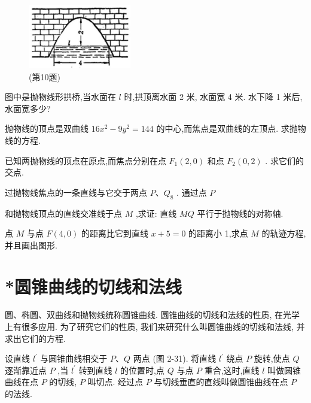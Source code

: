 \documentclass[lang=cn,newtx,12pt,scheme=chinese]{elegantbook}
\begin{document}
\begin{problemset}[习 题 八]
\begin{figure}[h]
  \centering
  \includegraphics[max width=0.4\textwidth]{images/01912cc2-ffb6-728e-9ae7-b113ff05c64b_116_944899.jpg}
  \caption{(第10题)}
\end{figure}

\item 图中是抛物线形拱桥,当水面在 \(l\) 时,拱顶离水面 2 米, 水面宽 4 米. 水下降 1 米后, 水面宽多少?

\item 抛物线的顶点是双曲线 \({16}{x}^{2} - 9{y}^{2} = {144}\) 的中心,而焦点是双曲线的左顶点. 求抛物线的方程.

\item 已知两抛物线的顶点在原点,而焦点分别在点 \({F}_{1}\left( {2,0}\right)\) 和点 \({F}_{2}\left( {0,2}\right)\) . 求它们的交点.

\item 过抛物线焦点的一条直线与它交于两点 \(P\text{、}{Q}_{8}\) . 通过点 \(P\)

和抛物线顶点的直线交准线于点 \(M\) ,求证: 直线 \({MQ}\) 平行于抛物线的对称轴.

\item 点 \(M\) 与点 \(F\left( {4,0}\right)\) 的距离比它到直线 \(x + 5 = 0\) 的距离小 1,求点 \(M\) 的轨迹方程,并且画出图形.

\end{problemset}

\section{*圆锥曲线的切线和法线}

圆、椭圆、双曲线和抛物线统称圆锥曲线. 圆锥曲线的切线和法线的性质, 在光学上有很多应用. 为了研究它们的性质, 我们来研究什么叫圆锥曲线的切线和法线, 并求出它们的方程.

\begin{definition}[切线和法线] 
设直线 \({l}^{\prime }\) 与圆锥曲线相交于 \(P\text{、}Q\) 两点 (图 2-31). 将直线 \({l}^{\prime }\) 绕点 \(P\) 旋转,使点 \(Q\) 逐渐靠近点 \(P\) ,当 \({l}^{\prime }\) 转到直线 \(l\) 的位置时,点 \(Q\) 与点 \(P\) 重合,这时,直线 \(l\) 叫做圆锥曲线在点 \(P\) 的切线, \(P\) 叫切点. 经过点 \(P\) 与切线垂直的直线叫做圆锥曲线在点 \(P\) 的法线.
\end{definition}
\end{document}
